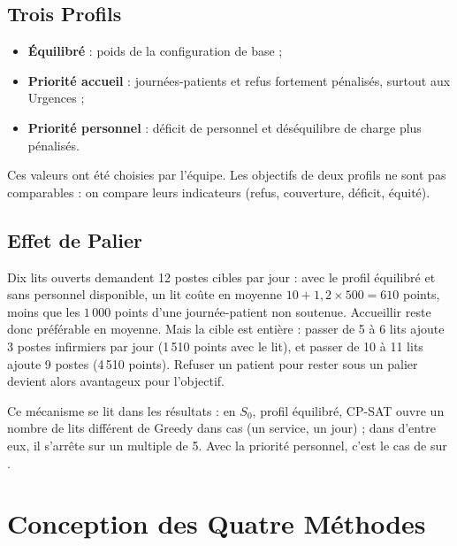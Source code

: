 \subsection{Trois Profils}


\begin{itemize}
    \item \textbf{Équilibré} : poids de la configuration de base ;
    \item \textbf{Priorité accueil} : journées-patients et refus fortement pénalisés, surtout aux Urgences ;
    \item \textbf{Priorité personnel} : déficit de personnel et déséquilibre de charge plus pénalisés.
\end{itemize}

Ces valeurs ont été choisies par l'équipe. Les objectifs de deux profils ne sont pas comparables : on compare leurs indicateurs (refus, couverture, déficit, équité).

\subsection{Effet de Palier}
Dix lits ouverts demandent 12 postes cibles par jour : avec le profil équilibré et sans personnel disponible, un lit coûte en moyenne $10 + 1{,}2 \times 500 = 610$ points, moins que les $1\,000$ points d'une journée-patient non soutenue. Accueillir reste donc préférable en moyenne. Mais la cible est entière : passer de 5 à 6 lits ajoute 3 postes infirmiers par jour (1\,510 points avec le lit), et passer de 10 à 11 lits ajoute 9 postes (4\,510 points). Refuser un patient pour rester sous un palier devient alors avantageux pour l'objectif.

Ce mécanisme se lit dans les résultats : en $S_0$, profil équilibré, CP-SAT ouvre un nombre de lits différent de Greedy dans \PaliersDiffEq{} cas (un service, un jour) ; dans \PaliersCinqEq{} d'entre eux, il s'arrête sur un multiple de 5. Avec la priorité personnel, c'est le cas de \PaliersCinqPer{} sur \PaliersDiffPer{}.

\section{Conception des Quatre Méthodes}

